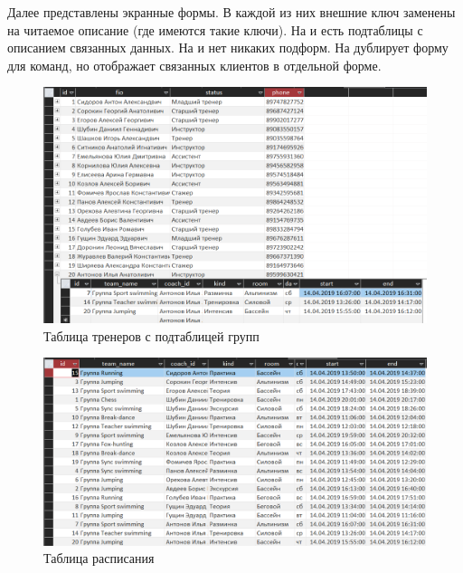 \documentclass[a4paper,14pt]{article}
\begin{document}
	 Далее представлены экранные формы.
	 В каждой из них внешние ключ заменены на читаемое описание (где имеются такие ключи).
	 На  и  есть подтаблицы с описанием связанных данных.
	 На  и  нет никаких подформ.
	 На  дублирует форму для команд, но отображает связанных клиентов в отдельной форме.
	 
	 \begin{figure}[H]
	 	\centering		
	 	\includegraphics[width=\linewidth]{image/5_coach}
	 	\caption{Таблица тренеров с подтаблицей групп}\label{img:5_coach}
	 \end{figure}

	 \begin{figure}[H]
		\centering		
		\includegraphics[width=\linewidth]{image/5_scheduler}
		\caption{Таблица расписания}\label{img:5_scheduler}
	\end{figure}	 
\end{document}
